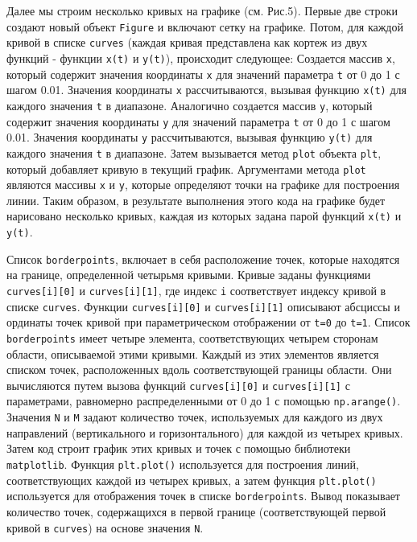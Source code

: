 \documentclass[a4paper,14pt,russian]{extreport}
\renewcommand{\_}{\kern-1.5pt\textunderscore\kern-1.5pt}
\begin{document}
Далее мы строим несколько кривых на графике (см. Рис.5). Первые две строки создают новый объект \texttt{Figure} и включают сетку на графике. Потом, для каждой кривой в списке \texttt{curves} (каждая кривая представлена как кортеж из двух функций - функции \texttt{x(t)} и \texttt{y(t)}), происходит следующее: Создается массив \texttt{x}, который содержит значения координаты \texttt{x} для значений параметра \texttt{t} от 0 до 1 с шагом 0.01. Значения координаты \texttt{x} рассчитываются, вызывая функцию \texttt{x(t)} для каждого значения \texttt{t} в диапазоне. Аналогично создается массив \texttt{y}, который содержит значения координаты \texttt{y} для значений параметра \texttt{t} от 0 до 1 с шагом 0.01. Значения координаты \texttt{y} рассчитываются, вызывая функцию \texttt{y(t)} для каждого значения \texttt{t} в диапазоне. Затем вызывается метод \texttt{plot} объекта \texttt{plt}, который добавляет кривую в текущий график. Аргументами метода \texttt{plot} являются массивы \texttt{x} и \texttt{y}, которые определяют точки на графике для построения линии. Таким образом, в результате выполнения этого кода на графике будет нарисовано несколько кривых, каждая из которых задана парой функций \texttt{x(t)} и \texttt{y(t)}.

Список \texttt{border\_points}, включает в себя расположение точек, которые находятся на границе, определенной четырьмя кривыми. Кривые заданы функциями \texttt{curves[i][0]} и \texttt{curves[i][1]}, где индекс \texttt{i} соответствует индексу кривой в списке \texttt{curves}. Функции \texttt{curves[i][0]} и \texttt{curves[i][1]} описывают абсциссы и ординаты точек кривой при параметрическом отображении от \texttt{t=0} до \texttt{t=1}. Список \texttt{border\_points} имеет четыре элемента, соответствующих четырем сторонам области, описываемой этими кривыми. Каждый из этих элементов является списком точек, расположенных вдоль соответствующей границы области. Они вычисляются путем вызова функций \texttt{curves[i][0]} и \texttt{curves[i][1]} с параметрами, равномерно распределенными от 0 до 1 с помощью \texttt{np.arange()}. Значения \texttt{N} и \texttt{M} задают количество точек, используемых для каждого из двух направлений (вертикального и горизонтального) для каждой из четырех кривых. Затем код строит график этих кривых и точек с помощью библиотеки \texttt{matplotlib}. Функция \texttt{plt.plot()} используется для построения линий, соответствующих каждой из четырех кривых, а затем функция \texttt{plt.plot()} используется для отображения точек в списке \texttt{border\_points}. Вывод показывает количество точек, содержащихся в первой границе (соответствующей первой кривой в \texttt{curves}) на основе значения \texttt{N}.
\end{document}
